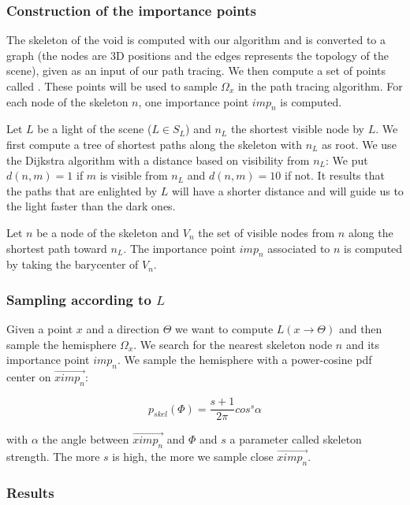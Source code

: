 \subsubsection{Construction of the importance points}

The skeleton of the void is computed with our algorithm and is converted to a graph (the nodes are 3D positions and the edges represents the topology of the scene), given as an input of our path tracing. We then compute a set of points called . These points will be used to sample $\Omega_x$ in the path tracing algorithm. For each node of the skeleton $n$, one importance point $imp_n$ is computed.

Let $L$ be a light of the scene ($L \in S_L$) and $n_L$ the shortest visible node by $L$. We first compute a tree of shortest paths along the skeleton with $n_L$ as root. We use the Dijkstra algorithm with a distance based on visibility from $n_L$: We put $d(n, m) = 1$ if $m$ is visible from $n_L$ and $d(n, m) = 10$ if not. It results that the paths that are enlighted by $L$ will have a shorter distance and will guide us to the light faster than the dark ones.

Let $n$ be a node of the skeleton and $V_n$ the set of visible nodes from $n$ along the shortest path toward $n_L$. The importance point $imp_n$ associated to $n$ is computed by taking the barycenter of $V_n$.

\subsubsection{Sampling according to $L$}

Given a point $x$ and a direction $\Theta$ we want to compute $L(x \rightarrow \Theta)$ and then sample the hemisphere $\Omega_x$. We search for the nearest skeleton node $n$ and its importance point $imp_n$. We sample the hemisphere with a power-cosine pdf center on $\overrightarrow{ximp_n}$:

\begin{equation*}
p_{skel}(\Phi) = \frac{s + 1}{2\pi} cos^s \alpha
\end{equation*}

with $\alpha$ the angle between $\overrightarrow{ximp_n}$ and $\Phi$ and $s$ a parameter called skeleton strength. The more $s$ is high, the more we sample close $\overrightarrow{ximp_n}$.

\subsubsection{Results}

